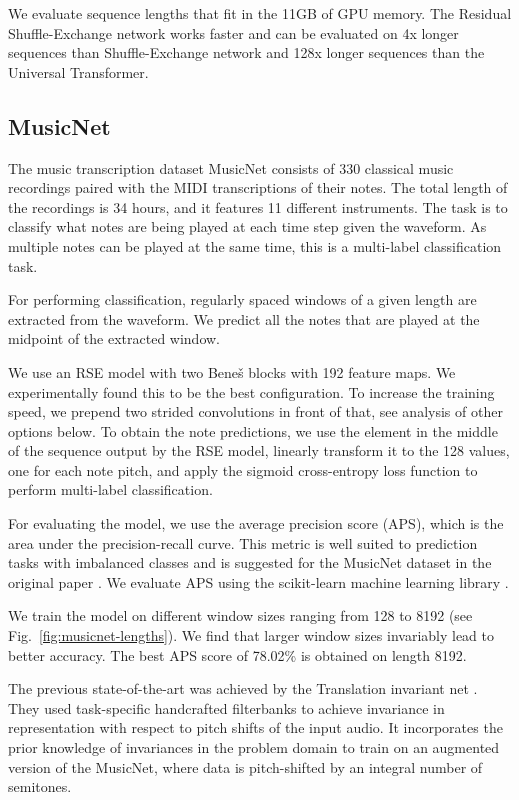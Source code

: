 \documentclass[letterpaper]{article} %
\begin{document}
We evaluate sequence lengths that fit in the 11GB of GPU memory. The Residual Shuffle-Exchange network works faster and can be evaluated on 4x longer sequences than Shuffle-Exchange network and 128x longer sequences than the Universal Transformer.


\subsection{MusicNet}

The music transcription dataset MusicNet \citep{thickstun2016learning} consists of 330 classical music recordings paired with the MIDI transcriptions of their notes. The total length of the recordings is 34 hours, and it features 11 different instruments. The task is to classify what notes are being played at each time step given the waveform. As multiple notes can be played at the same time, this is a multi-label classification task.

For performing classification, regularly spaced windows of a given length are extracted from the waveform. We predict all the notes that are played at the midpoint of the extracted window.

We use an RSE model with two Bene\v{s} blocks with 192 feature maps. We experimentally found this to be the best configuration. To increase the training speed, we prepend two strided convolutions in front of that, see analysis of other options below. To obtain the note predictions, we use the element in the middle of the sequence output by the RSE model, linearly transform it to the 128 values, one for each note pitch, and apply the sigmoid cross-entropy loss function to perform multi-label classification.

For evaluating the model, we use the average precision score (APS), which is the area under the precision-recall curve. This metric is well suited to prediction tasks with imbalanced classes and is suggested for the MusicNet dataset in the original paper \citep{thickstun2016learning}. We evaluate APS using the scikit-learn machine learning library \citep{pedregosa2011scikit}.


We train the model on different window sizes ranging from 128 to 8192 (see  Fig.~\ref{fig:musicnet-lengths}). We find that larger window sizes invariably lead to better accuracy. The best APS score of 78.02\% is obtained on length 8192.

The previous state-of-the-art was achieved by the Translation invariant net \citep{Thickstun2018InvariancesAD}. They used task-specific handcrafted filterbanks to achieve invariance in representation with respect to pitch shifts of the input audio. It incorporates the prior knowledge of invariances in the problem domain to train on an augmented version of the MusicNet, where data is pitch-shifted by an integral number of semitones.
\end{document}
